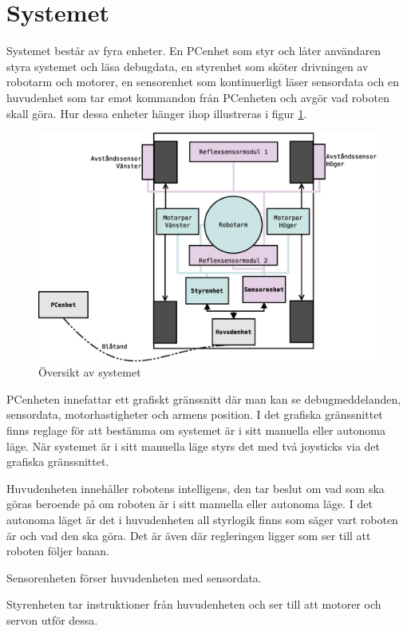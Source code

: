 
\section{Systemet}
Systemet består av fyra enheter. En PCenhet som styr och låter användaren styra systemet och läsa debugdata, en styrenhet som sköter drivningen av robotarm och motorer, en sensorenhet som kontinuerligt läser sensordata och en huvudenhet som tar emot kommandon från PCenheten och avgör vad roboten skall göra. Hur dessa enheter hänger ihop illustreras i figur \ref{system-oversikt}.

\begin{figure}[h!]
	\centering
	\includegraphics[scale=0.4]{grafik/system-oversikt}
	\caption{Översikt av systemet} \label{system-oversikt}
\end{figure}

PCenheten innefattar ett grafiskt gränssnitt där man kan se debugmeddelanden, sensordata, motorhastigheter och armens position. I det grafiska gränssnittet finns reglage för att bestämma om systemet är i sitt manuella eller autonoma läge. När systemet är i sitt manuella läge styrs det med två joysticks via det grafiska gränssnittet.

Huvudenheten innehåller robotens intelligens, den tar beslut om vad som ska göras beroende på om roboten är i sitt manuella eller autonoma läge. I det autonoma läget är det i huvudenheten all styrlogik finns som säger vart roboten är och vad den ska göra. Det är även där regleringen ligger som ser till att roboten följer banan.

Sensorenheten förser huvudenheten med sensordata.

Styrenheten tar instruktioner från huvudenheten och ser till att motorer och servon utför dessa.
